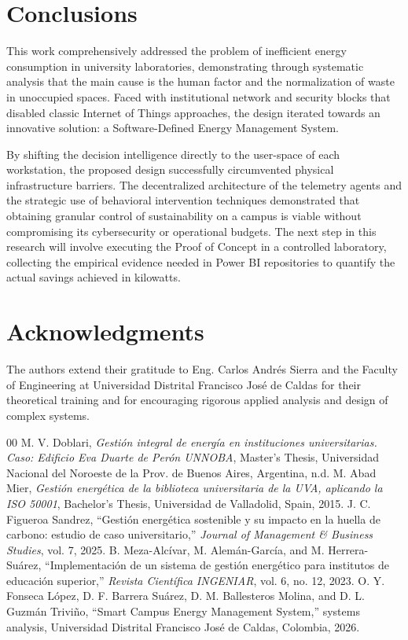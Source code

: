 \documentclass[conference]{IEEEtran}
\begin{document}
\section{Conclusions}
This work comprehensively addressed the problem of inefficient energy consumption in university laboratories, demonstrating through systematic analysis that the main cause is the human factor and the normalization of waste in unoccupied spaces. Faced with institutional network and security blocks that disabled classic Internet of Things approaches, the design iterated towards an innovative solution: a Software-Defined Energy Management System.

By shifting the decision intelligence directly to the user-space of each workstation, the proposed design successfully circumvented physical infrastructure barriers. The decentralized architecture of the telemetry agents and the strategic use of behavioral intervention techniques demonstrated that obtaining granular control of sustainability on a campus is viable without compromising its cybersecurity or operational budgets. The next step in this research will involve executing the Proof of Concept in a controlled laboratory, collecting the empirical evidence needed in Power BI repositories to quantify the actual savings achieved in kilowatts.

\section*{Acknowledgments}
The authors extend their gratitude to Eng. Carlos Andrés Sierra and the Faculty of Engineering at Universidad Distrital Francisco José de Caldas for their theoretical training and for encouraging rigorous applied analysis and design of complex systems.

\begin{thebibliography}{00}
 M. V. Doblari, \textit{Gestión integral de energía en instituciones universitarias. Caso: Edificio Eva Duarte de Perón UNNOBA}, Master's Thesis, Universidad Nacional del Noroeste de la Prov. de Buenos Aires, Argentina, n.d.
 M. Abad Mier, \textit{Gestión energética de la biblioteca universitaria de la UVA, aplicando la ISO 50001}, Bachelor's Thesis, Universidad de Valladolid, Spain, 2015.
 J. C. Figueroa Sandrez, ``Gestión energética sostenible y su impacto en la huella de carbono: estudio de caso universitario,'' \textit{Journal of Management \& Business Studies}, vol. 7, 2025.
 B. Meza-Alcívar, M. Alemán-García, and M. Herrera-Suárez, ``Implementación de un sistema de gestión energético para institutos de educación superior,'' \textit{Revista Científica INGENIAR}, vol. 6, no. 12, 2023.
 O. Y. Fonseca López, D. F. Barrera Suárez, D. M. Ballesteros Molina, and D. L. Guzmán Triviño, ``Smart Campus Energy Management System,'' systems analysis, Universidad Distrital Francisco José de Caldas, Colombia, 2026.
\end{thebibliography}
\end{document}
